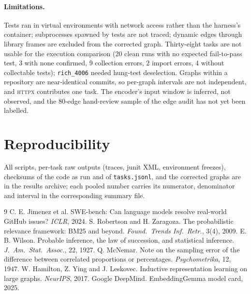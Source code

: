 \documentclass[10pt,a4paper]{article}
\begin{document}
\paragraph{Limitations.} Tests ran in virtual environments with network access rather than the harness's container; subprocesses spawned by tests are not traced; dynamic edges through library frames are excluded from the corrected graph. Thirty-eight tasks are not usable for the execution comparison (20 clean runs with no expected fail-to-pass test, 3 with none confirmed, 9 collection errors, 2 import errors, 4 without collectable tests); \texttt{rich\_4006} needed hung-test deselection. Graphs within a repository are near-identical commits, so per-graph intervals are not independent, and \textsc{httpx} contributes one task. The encoder's input window is inferred, not observed, and the 80-edge hand-review sample of the edge audit has not yet been labelled.

\section*{Reproducibility}
All scripts, per-task raw outputs (traces, junit XML, environment freezes), checksums of the code as run and of \texttt{tasks.jsonl}, and the corrected graphs are in the results archive; each pooled number carries its numerator, denominator and interval in the corresponding summary file.

\begin{thebibliography}{9}
 C. E. Jimenez et al. SWE-bench: Can language models resolve real-world GitHub issues? \emph{ICLR}, 2024.
 S. Robertson and H. Zaragoza. The probabilistic relevance framework: BM25 and beyond. \emph{Found.\ Trends Inf.\ Retr.}, 3(4), 2009.
 E. B. Wilson. Probable inference, the law of succession, and statistical inference. \emph{J.\ Am.\ Stat.\ Assoc.}, 22, 1927.
 Q. McNemar. Note on the sampling error of the difference between correlated proportions or percentages. \emph{Psychometrika}, 12, 1947.
 W. Hamilton, Z. Ying and J. Leskovec. Inductive representation learning on large graphs. \emph{NeurIPS}, 2017.
 Google DeepMind. EmbeddingGemma model card, 2025.
\end{thebibliography}
\end{document}
